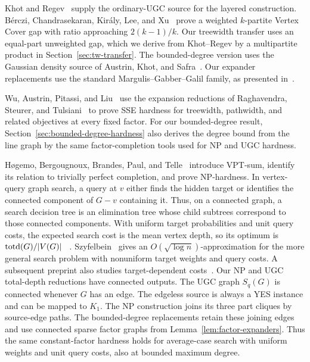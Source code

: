 Khot and Regev~\cite{KhotRegev} supply the ordinary-\textup{UGC} source for
the layered construction. B\'erczi, Chandrasekaran, Kir\'aly, Lee,
and Xu~\cite[Sections~3.5--3.6]{BCKLX2017} prove a weighted $k$-partite
Vertex Cover gap with ratio approaching $2(k-1)/k$. Our treewidth
transfer uses an equal-part unweighted gap, which we derive from
Khot--Regev by a multipartite product in
Section~\ref{sec:tw-transfer}. The
bounded-degree version uses the Gaussian density source of Austrin,
Khot, and Safra~\cite{AKS2011}. Our expander replacements use the
standard Margulis--Gabber--Galil family, as presented
in~\cite[Construction~8.1 and Theorem~8.2]{HLW2006}.

Wu, Austrin, Pitassi, and Liu~\cite{APW} use the expansion reductions
of Raghavendra, Steurer, and Tulsiani~\cite{RST} to prove \textup{SSE} hardness
for treewidth, pathwidth, and related objectives at every fixed factor.
For our
bounded-degree result, Section~\ref{sec:bounded-degree-hardness} also
derives the degree bound from the line graph by the same
factor-completion tools used for \textup{NP} and \textup{UGC} hardness.

H\o gemo, Bergougnoux, Brandes, Paul, and Telle~\cite{HogemoEtAl2021} introduce VPT-sum,
identify its relation to trivially perfect completion, and prove
\textup{NP}-hardness. In vertex-query graph search, a query at $v$ either finds
the hidden target or identifies the connected component of $G-v$ containing it.
Thus, on a connected graph, a search decision tree is an elimination
tree whose child subtrees correspond to those connected components. With uniform
target probabilities and unit query costs, the expected search cost
is the mean vertex depth, so its optimum is $\operatorname{totd}(G)/|V(G)|$
~\cite{HogemoEtAl2021,Szyfelbein2025GraphSearch}.
Szyfelbein~\cite{Szyfelbein2025GraphSearch} gives an
$O(\sqrt{\log n})$-approximation for the more general search
problem with nonuniform target weights and query costs. A subsequent
preprint also studies target-dependent costs~\cite{Szyfelbein2026GraphSearch}.
Our \textup{NP} and \textup{UGC} total-depth reductions have connected outputs. The \textup{UGC}
graph $S_q(G)$ is connected whenever $G$ has an edge. The edgeless
source is always a YES instance and can be mapped to $K_1$. The \textup{NP}
construction joins its three part cliques by source-edge paths. The
bounded-degree replacements retain these joining edges and use
connected sparse factor graphs from Lemma~\ref{lem:factor-expanders}.
Thus the same
constant-factor hardness holds for average-case search with uniform
weights and unit query costs, also at bounded maximum degree.

